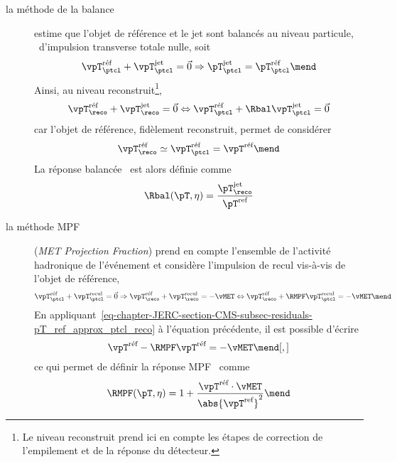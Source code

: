 \begin{description}
\item[la méthode de la balance] estime que l'objet de référence et le jet sont balancés au niveau particule, \ie\ d'impulsion transverse totale nulle, soit
\begin{equation}
\vpT_\ptcl^\text{réf} + \vpT_\ptcl^\text{jet} = \vec{0}
\Rightarrow
\pT_\ptcl^\text{jet} = \pT_\ptcl^\text{réf}
\mend
\end{equation}
Ainsi, au niveau reconstruit\footnote{Le niveau reconstruit prend ici en compte les étapes de correction de l'empilement et de la réponse du détecteur.},
\begin{equation}
\vpT_\reco^\text{réf} + \vpT_\reco^\text{jet} = \vec{0}
\Leftrightarrow
\vpT_\ptcl^\text{réf} + \Rbal\vpT_\ptcl^\text{jet} = \vec{0}
\end{equation}
car l'objet de référence, fidèlement reconstruit, permet de considérer
\begin{equation}
\vpT_\reco^\text{réf} \simeq \vpT_\ptcl^\text{réf} = \vpT^\text{réf}
\mend
\label{eq-chapter-JERC-section-CMS-subsec-residuals-pT_ref_approx_ptcl_reco}
\end{equation}
La réponse balancée \Rbal\ est alors définie comme
\begin{equation}
\Rbal (\pT, \eta) = \frac{\pT_\reco^\text{jet}}{\pT^\text{ref}}
\label{eq-chapter-JERC-section-CMS-subsec-residuals-Rbal_def}
\end{equation}
\item[la méthode \og MPF \fg] (\emph{MET Projection Fraction}) prend en compte l'ensemble de l'activité hadronique de l'événement et considère l'impulsion de recul vis-à-vis de l'objet de référence, \ie
\begin{equation}
\vpT_\ptcl^\text{réf} + \vpT_\ptcl^\text{recul} = \vec{0}
\Rightarrow
\vpT_\reco^\text{réf} + \vpT_\reco^\text{recul} = -\vMET
\Leftrightarrow
\vpT_\reco^\text{réf} + \RMPF\vpT_\ptcl^\text{recul} = -\vMET
\mend
\end{equation}
En appliquant~\eqref{eq-chapter-JERC-section-CMS-subsec-residuals-pT_ref_approx_ptcl_reco} à l'équation précédente, il est possible d'écrire
\begin{equation}
\vpT^\text{réf} - \RMPF\vpT^\text{réf} = -\vMET
\mend[,]
\end{equation}
ce qui permet de définir la réponse MPF \RMPF\ comme
\begin{equation}
\RMPF (\pT, \eta) = 1 + \frac{\vpT^\text{réf}\cdot\vMET}{\abs{\vpT^\text{ref}}^2}
\mend
\end{equation}
\end{description}
